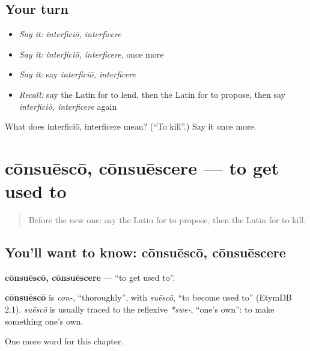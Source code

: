 \subsection*{Your turn}
\begin{itemize}
\raggedright
  \item \emph{Say it:} \emph{interficiō, interficere}
  \item \emph{Say it:} \emph{interficiō, interficere}, once more
  \item \emph{Say it:} say \emph{interficiō, interficere}
  \item \emph{Recall:} say the Latin for to lend, then the Latin for to propose, then say \emph{interficiō, interficere} again
\end{itemize}

\begin{tcolorbox}[breakable,colback=teal!4,colframe=teal!35!black,title={Before you move on}]
What does interficiō, interficere mean? (\textquotedblleft{}To kill\textquotedblright{}.) Say it once more.
\end{tcolorbox}
\section[cōnsuēscō, cōnsuēscere]{cōnsuēscō, cōnsuēscere — to get used to}

\label{lesson:LA-C169-consuesco}



\begin{quote}
Before the new one: say the Latin for to propose, then the Latin for to kill.
\end{quote}

\subsection*{You'll want to know: cōnsuēscō, cōnsuēscere}
\textbf{cōnsuēscō, cōnsuēscere} — \textquotedblleft{}to get used to\textquotedblright{}.

\begin{cousinweb}
\textbf{cōnsuēscō} is \emph{con-}, \textquotedblleft{}thoroughly\textquotedblright{}, with \emph{suēscō}, \textquotedblleft{}to become used to\textquotedblright{} (EtymDB 2.1). \emph{suēscō} is usually traced to the reflexive \emph{*swe-}, \textquotedblleft{}one's own\textquotedblright{}: to make something one's own.
\end{cousinweb}

\begin{grammarlens}[title={What you've built}]
One more word for this chapter.
\end{grammarlens}

